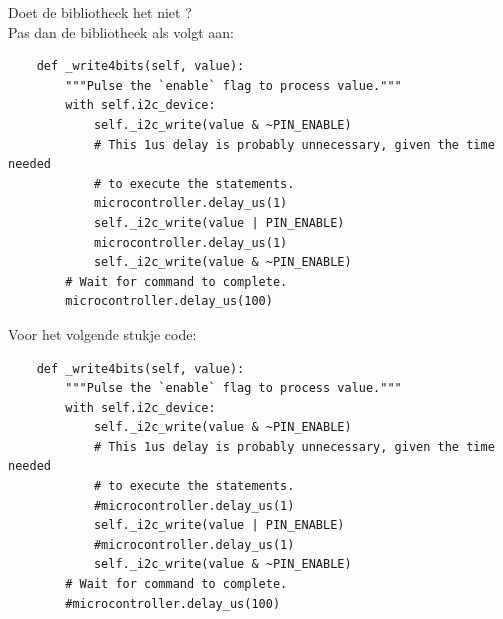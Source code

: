 \clearpage
\newpage

Doet de bibliotheek het niet ? \\

Pas dan de bibliotheek als volgt aan:

\begin{lstlisting}
    def _write4bits(self, value):
        """Pulse the `enable` flag to process value."""
        with self.i2c_device:
            self._i2c_write(value & ~PIN_ENABLE)
            # This 1us delay is probably unnecessary, given the time needed
            # to execute the statements.
            microcontroller.delay_us(1)
            self._i2c_write(value | PIN_ENABLE)
            microcontroller.delay_us(1)
            self._i2c_write(value & ~PIN_ENABLE)
        # Wait for command to complete.
        microcontroller.delay_us(100)
\end{lstlisting}

Voor het volgende stukje code:

\begin{lstlisting}
    def _write4bits(self, value):
        """Pulse the `enable` flag to process value."""
        with self.i2c_device:
            self._i2c_write(value & ~PIN_ENABLE)
            # This 1us delay is probably unnecessary, given the time needed
            # to execute the statements.
            #microcontroller.delay_us(1)
            self._i2c_write(value | PIN_ENABLE)
            #microcontroller.delay_us(1)
            self._i2c_write(value & ~PIN_ENABLE)
        # Wait for command to complete.
        #microcontroller.delay_us(100)
\end{lstlisting}